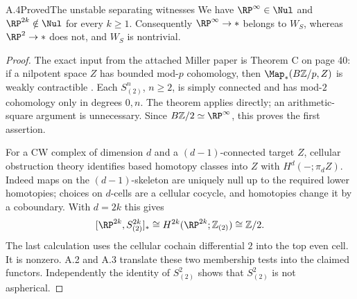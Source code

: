 \begin{claim}{A.4}{Proved}{The unstable separating witnesses}\label{A4}
We have $\RP^\infty\in\Nul$ and $\RP^{2k}\notin\Nul$ for every $k\geq1$. Consequently $\RP^\infty\to *$ belongs to $W_S$, whereas $\RP^2\to *$ does not, and $W_S$ is nontrivial.
\end{claim}
\begin{proof}
The exact input from the attached Miller paper is Theorem C on page 40: if a nilpotent space $Z$ has bounded mod-$p$ cohomology, then $\Map_*(B\mathbb Z/p,Z)$ is weakly contractible \citep[Theorem C]{Miller1984}. Each $S^n_{(2)}$, $n\geq2$, is simply connected and has mod-$2$ cohomology only in degrees $0,n$. The theorem applies directly; an arithmetic-square argument is unnecessary. Since $B\mathbb Z/2\simeq\RP^\infty$, this proves the first assertion.

For a CW complex of dimension $d$ and a $(d-1)$-connected target $Z$, cellular obstruction theory identifies based homotopy classes into $Z$ with $H^d(-;\pi_d Z)$. Indeed maps on the $(d-1)$-skeleton are uniquely null up to the required lower homotopies; choices on $d$-cells are a cellular cocycle, and homotopies change it by a coboundary. With $d=2k$ this gives
\[
 [\RP^{2k},S^{2k}_{(2)}]_*\cong
 H^{2k}(\RP^{2k};\mathbb Z_{(2)})\cong\mathbb Z/2.
\]
The last calculation uses the cellular cochain differential $2$ into the top even cell. It is nonzero. A.2 and A.3 translate these two membership tests into the claimed functors. Independently the identity of $S^2_{(2)}$ shows that $S^2_{(2)}$ is not aspherical.
\end{proof}

